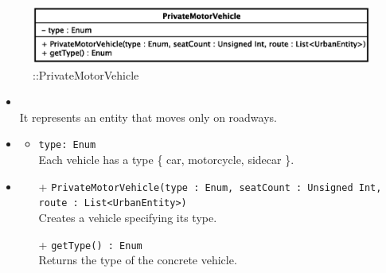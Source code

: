 \begin{figure}[h]
\centering
\includegraphics[scale=0.6,keepaspectratio]{images/solution/app/backend/private_motor_vehicle.eps}
\caption{\pActive::PrivateMotorVehicle}
\label{fig:sd-app-private-motor-vehicle}
\end{figure}
\FloatBarrier
\begin{itemize}
  \item \textbf{\descr} \\
It represents an entity that moves only on roadways.
  \item \textbf{\attrs}
  \begin{itemize}
    \item \texttt{type: Enum} \\
Each vehicle has a type \{ car, motorcycle, sidecar \}.
  \end{itemize}
  \item \textbf{\ops}
  \begin{itemize}
  \item[+] \texttt{PrivateMotorVehicle(type : Enum, seatCount : Unsigned Int, route : List<UrbanEntity>)} \\
Creates a vehicle specifying its type.
    \item[+] \texttt{getType() : Enum} \\
Returns the type of the concrete vehicle.
  \end{itemize}
\end{itemize} 
